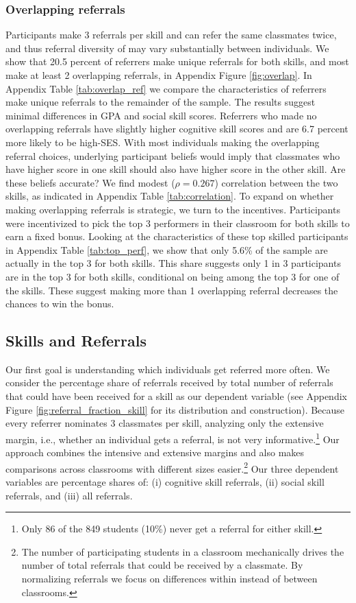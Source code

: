 \documentclass[11pt,a4paper,oneside]{article}
\begin{document}
\subsubsection*{Overlapping referrals}
Participants make 3 referrals per skill and can refer the same classmates twice, and thus referral diversity of may vary substantially between individuals. We show that 20.5 percent of referrers make unique referrals for both skills, and most make at least 2 overlapping referrals, in Appendix Figure \ref{fig:overlap}. In Appendix Table \ref{tab:overlap_ref} we compare the characteristics of referrers make unique referrals to the remainder of the sample. The results suggest minimal differences in GPA and social skill scores. Referrers who made no overlapping referrals have slightly higher cognitive skill scores and are 6.7 percent more likely to be high-SES. With most individuals making the overlapping referral choices, underlying participant beliefs would imply that classmates who have higher score in one skill should also have higher score in the other skill. Are these beliefs accurate? We find  modest ($\rho = 0.267$) correlation between the two skills, as indicated in Appendix Table \ref{tab:correlation}. To expand on whether making overlapping referrals is strategic, we turn to the incentives. Participants were incentivized to pick the top 3 performers in their classroom for both skills to earn a fixed bonus. Looking at the characteristics of these top skilled participants in Appendix Table \ref{tab:top_perf}, we show that only 5.6\% of the sample are actually in the top 3 for both skills. This share suggests only 1 in 3 participants are in the top 3 for both skills, conditional on being among the top 3 for one of the skills. These suggest making more than 1 overlapping referral decreases the chances to win the bonus.
\subsection{Skills and Referrals}
Our first goal is understanding which individuals get referred more often. We consider the percentage share of referrals received by total number of referrals that could have been received for a skill as our dependent variable (see Appendix Figure \ref{fig:referral_fraction_skill} for its distribution and construction). Because every referrer nominates 3 classmates per skill, analyzing only the extensive margin, i.e., whether an individual gets a referral, is not very informative.\footnote{Only 86 of the 849 students (10\%) never get a referral for either skill.} Our approach combines the intensive and extensive margins and also makes comparisons across classrooms with different sizes easier.\footnote{The number of participating students in a classroom mechanically drives the number of total referrals that could be received by a classmate. By normalizing referrals we focus on differences within instead of between classrooms.} Our three dependent variables are percentage shares of: (i) cognitive skill referrals, (ii) social skill referrals, and (iii) all referrals.
\end{document}
